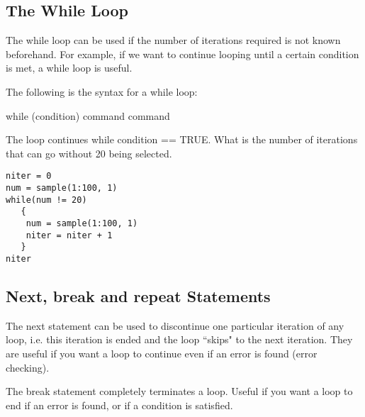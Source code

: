 \subsection{The While Loop}
The while loop can be used if the number of iterations required is not known beforehand. For example, if we want to continue looping until a certain condition is met, a while loop is useful.

The following is the syntax for a while loop:

while (condition){
command
command
}

The loop continues while condition == TRUE.
What is the number of iterations that can go without 20 being selected.

\begin{verbatim}
niter = 0		
num = sample(1:100, 1)
while(num != 20) 
   {
    num = sample(1:100, 1)
    niter = niter + 1
   }
niter
\end{verbatim}

\subsection*{Next, break and repeat Statements}
The next statement can be used to discontinue one particular iteration of any loop, i.e. this iteration is ended and the loop “skips" to the next iteration. They are useful if you want a loop to continue even if an error is found (error checking).

The break statement completely terminates a loop. Useful if you want a loop to end if an error is found, or if a condition is satisfied.




 

